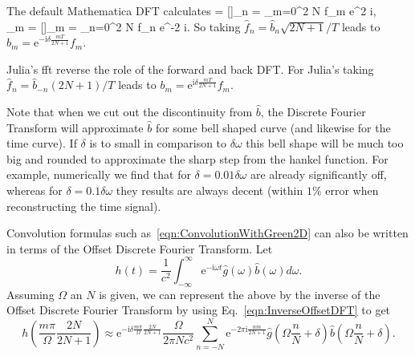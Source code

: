 \documentclass[ 12pt, a4paper]{article}
\newcommand{\be}{\begin{equation}}
\newcommand{\en}{\end{equation}}
\def\bga#1\ega{\begin{gather}#1\end{gather}} %
\newcommand{\ii}{\textrm{i}}
\newcommand{\ee}{\textrm{e}}
\renewcommand{\vec}[1]{\boldsymbol{#1}}
\begin{document}
The default Mathematica DFT calculates
\bga
\hat {\vec f_n} = [\vec f]_n =  \sum_{m=0}^{2 N} f_m \ee^{2 \pi \ii {}},
\\
{\vec f_m} = [\hat{\vec f}]_m =  \sum_{n=0}^{2 N} \hat f_n \ee^{-2 \pi \ii {}}.
\ega
So taking $\hat f_n = \hat b_n \sqrt{2N +1}/T$ leads to $b_m = \ee^{-\ii \delta \frac{m T}{2N+1}} f_m$.

Julia's fft reverse the role of the forward and back DFT. For Julia's taking $\hat f_n = \hat b_{-n} (2N +1)/T$ leads to $b_m = \ee^{\ii \delta \frac{m T}{2N+1}} f_m$.

Note that when we cut out the discontinuity from $\hat b$, the Discrete Fourier Transform will approximate $\hat b$ for some bell shaped curve (and likewise for the time curve). If $\delta$ is to small in comparison to $\delta \omega$ this bell shape will be much too big and rounded to approximate the sharp step from the hankel function. For example, numerically we find that for $\delta = 0.01 \delta \omega$ are already significantly off, whereas for $\delta =0.1 \delta \omega$ they results are always decent (within $1\%$ error when reconstructing the time signal).


Convolution formulas such as~\eqref{eqn:ConvolutionWithGreen2D} can also be written in terms of the Offset Discrete Fourier Transform. Let
\be
h(t) =  \frac{1}{c^2} \int_{-\infty}^\infty \ee^{-\ii \omega t} \hat g(\omega) \hat b(\omega) d \omega.
\en
Assuming $\Omega$ an $N$ is given, we can represent the above by the inverse of the Offset Discrete Fourier Transform by using Eq.~\eqref{eqn:InverseOffsetDFT} to get
\be
h\left (  \frac{m  \pi}{\Omega} \frac{2 N } {2 N +1} \right) \approx \ee^{- \ii \delta \frac{m \pi}{\Omega} \frac{2 N} {2 N +1}}  \frac{\Omega}{2 \pi N c^2}   \sum_{n = -N}^N \ee^{- 2 \pi \ii   \frac{  n m } {2 N +1} } \hat g\left (\Omega \frac{n}{N}  +\delta \right) \hat b\left ( \Omega \frac{n}{N}  +\delta \right)   .
\en
\end{document}
